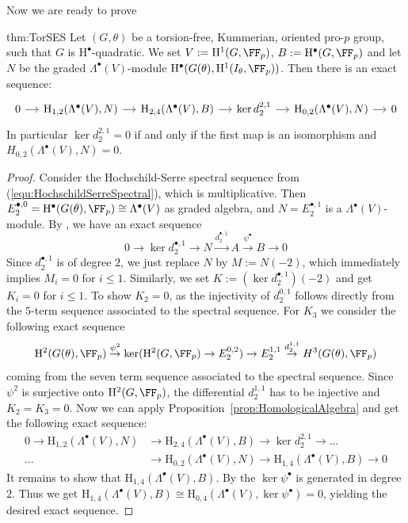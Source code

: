 \documentclass{amsart}
\theoremstyle{definition}
\theoremstyle{remark}
\newcommand{\rmH}{\mathrm{H}}
\numberwithin{equation}{section}
\begin{document}
Now we are ready to prove 
\begin{repthm}{thm:TorSES}
    Let $(G,\theta)$ be a torsion-free, Kummerian, oriented pro-$p$ group, such that $G$ is $\rmH^\bullet$-quadratic. We set  $V:=\rmH^1(G,\FF_p)$, $B:=\rmH^\bullet(G,\FF_p)$ and let $N$ be the graded $\Lambda^\bullet(V)$-module $\rmH^\bullet(G(\theta),\rmH^1(I_\theta,\FF_p))$. Then there is an exact sequence:
    \begin{equation*}
        \begin{tikzcd}[column sep=small]
            0\arrow[r]&\rmH_{1,2}(\Lambda^\bullet(V),N)\arrow[r] &\rmH_{2,4}(\Lambda^\bullet(V),B)\arrow[r] &\ker d_2^{2,1}\arrow[r]&\rmH_{0,2}(\Lambda^\bullet(V),N)\arrow[r]&0
        \end{tikzcd}
    \end{equation*}
    In particular $\ker d_2^{2,1}=0$ if and only if the first map is an isomorphism and $H_{0,2}(\Lambda^\bullet(V),N)=0$.
\end{repthm}
\begin{proof}
    Consider the Hochschild-Serre spectral sequence from (\ref{equ:HochschildSerreSpectral}), which is multiplicative. Then $E_2^{\bullet,0}=\rmH^\bullet(G(\theta),\FF_p)\cong \Lambda^\bullet(V)$ as graded algebra, and $N=E_2^{\bullet,1}$ is a $\Lambda^\bullet(V)$-module. By \cite[Proposition 4.4 (ii)]{QuadrelliWeigel2022}, we have an exact sequence
    \begin{equation*}    
            0\longrightarrow \ker d^{\bullet,1}_2\longrightarrow N\overset{d^{\bullet,1}_2}\longrightarrow A\overset{\psi^\bullet}{\longrightarrow}B\longrightarrow 0
    \end{equation*}
    Since $d^{\bullet,1}_2$ is of degree $2$, we just replace $N$ by $M:=N(-2)$, which immediately implies $M_i=0$ for $i\leq 1$. Similarly, we set $K:=(\ker d_2^{\bullet,1})(-2)$ and get $K_i=0$ for $i\leq 1$. To show $K_2=0$, as the injectivity of $d^{0,1}_2$ follows directly from the $5$-term sequence associated to the spectral sequence. For $K_3$ we consider the following exact sequence
    \begin{equation*}
        \rmH^2(G(\theta),\FF_p)\overset{\psi^2}\to \ker(\rmH^2(G,\FF_p)\to E_2^{0,2})\to E^{1,1}_2\overset{d^{1,1}_2}\to  H^3(G(\theta),\FF_p) 
    \end{equation*}
    coming from the seven term sequence associated to the spectral sequence. Since $\psi^2$ is surjective onto $\rmH^2(G,\FF_p)$, the differential $d^{1,1}_2$ has to be injective and $K_2=K_3=0$. Now we can apply Proposition~\ref{prop:HomologicalAlgebra} and get the following exact sequence:
    \begin{align*}
            0\to\rmH_{1,2}(\Lambda^\bullet(V),N)&\to\rmH_{2,4}(\Lambda^\bullet(V),B)\to\ker d_2^{2,1}\to ...\\...&\to\rmH_{0,2}(\Lambda^\bullet(V),N)\to\rmH_{1,4}(\Lambda^\bullet(V),B)\to 0
    \end{align*}
    It remains to show that $\rmH_{1,4}(\Lambda^\bullet(V),B)$. By \cite[Section 4.2]{QuadrelliWeigel2022} the $\ker\psi^\bullet$ is generated in degree $2$. Thus we get $\rmH_{1,4}(\Lambda^\bullet(V),B)\cong \rmH_{0,4}(\Lambda^\bullet(V),\ker \psi^\bullet)=0$, yielding the desired exact sequence.
\end{proof}
\end{document}
